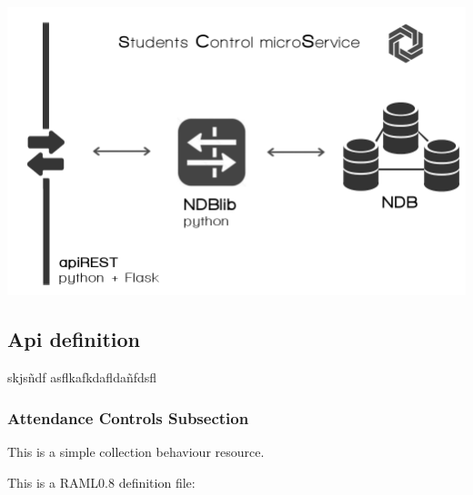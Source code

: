 \begin{center}
\includegraphics[scale=0.4]{img/graphics/scms.png}
\end{center}

\subsection{Api definition}

skjsñdf
asflkafkdafldañfdsfl


\subsubsection{Attendance Controls Subsection}

This is a simple collection behaviour resource.

This is a RAML0.8 definition file:

